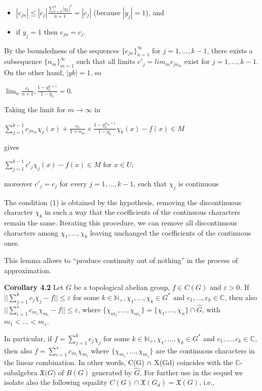 \documentclass[12pt]{article}
\begin{document}
\begin{itemize}

    \item $|c_{jn}| \leqslant |c_j| \frac{\sum^{n}_{t=0} |y_k|^t}{n+1} = |c_j|$ (because $|y_j| = 1$), and

    \item if $y_j = 1$ then $c_{jn} = c_j$.

\end{itemize}


By the boundedness of the sequences $\{c_{jn}\}^{\infty}_{n=1}$ for $j = 1,...,k - 1$, there exists a subsequence $\{n_m\}^{\infty}_{m=1}$ such that all limits
$c'_j = lim_m c_{jn_m}$ exist for $j = 1,...,k - 1$. On the other hand, $|yk| = 1$, so

    $\lim_{n} \frac{c_k}{n+1}, \frac{1-y^{n+1}_k}{1-y_k} = 0$.


Taking the limit for $m \to \infty$ in


    $\sum_{j=1}^{k-1} c_{jn_m} \chi_j(x) + \frac{c_k}{1+n_m} \times \frac{1-y^{n_m + 1}_{k}}{1 - y_k} \chi_k (x) - f(x) \in M$


gives


    $\sum_{j=1}^{k-1} c'_j \chi_j (x) - f(x) \in M$ for $x \in U$;


moreover $c'_j = c_j$ for every $j = 1,...,k - 1$, such that $\chi_j$ is continuous


    The condition (1) is obtained by the hypothesis, removing the discontinuous character $\chi_k$ in such a way that the coefficients
of the continuous characters remain the same. Iterating this procedure, we can remove all discontinuous characters
among $\chi_1,...,\chi_k$ leaving unchanged the coefficients of the continuous ones.


    This lemma allows to “produce continuity out of nothing” in the process of approximation.


\textbf{Corollary 4.2} Let $G$ be a topological abelian group, $f \in C(G)$ and $\varepsilon > 0$. If $||\sum^{k}_{j=1} c_j \chi_j - f || \leqslant \varepsilon$ for some $k \in \mathbb{N}_+, \chi_1,...,\chi_k \in G^*$
and $c_1,..., c_k \in \mathbb{C}$, then also $|| \sum^{s}_{i=1} c_{m_i} \chi_{m_i} - f || \leqslant \varepsilon$, where $\{\chi_{m_1} ,...,\chi_{m_s} \} = \{\chi_1,...,\chi_n\} \cap \widehat{G}$, with $m_1 < ... < m_s$.


    In particular, if $f = \sum^{k}_{j=1} c_j \chi_j$ for some $k \in \mathbb{N}_+, \chi_1,...,\chi_k \in G^*$ and $c_1,..., c_k \in \mathbb{C}$, then also $f = \sum^{s}_{i=1} c_{m_i} \chi_{m_i}$ where
$\{\chi_{m_1} ,...,\chi_{m_s}\}$ are the continuous characters in the linear combination. In other words, C(G) ∩ X(Gd) coincides with the
$\mathbb{C}$-subalgebra $\mathfrak{X}(G$) of $B(G)$ generated by $\widehat{G}$. For further use in the sequel we isolate also the following equality
$C(G) \cap \mathfrak{X}(G_d) = \mathfrak{X}(G)$, i.e.,
\end{document}
